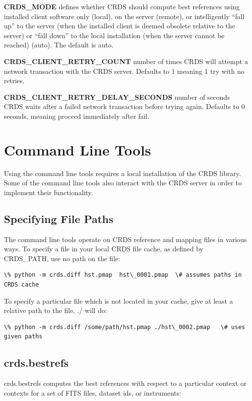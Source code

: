 \documentclass[letterpaper,10pt,english]{sphinxmanual}
\begin{document}
\textbf{CRDS\_MODE} defines whether CRDS should compute best references using
installed client software only (local),  on the server (remote),  or
intelligently ``fall up'' to the server (when the installed client is deemed
obsolete relative to the server) or ``fall down'' to the local installation
(when the server cannot be reached) (auto).   The default is auto.

\textbf{CRDS\_CLIENT\_RETRY\_COUNT} number of times CRDS will attempt a network
transaction with the CRDS server.  Defaults to 1 meaning 1 try with no retries.

\textbf{CRDS\_CLIENT\_RETRY\_DELAY\_SECONDS} number of seconds CRDS waits after a failed
network transaction before trying again.  Defaults to 0 seconds,  meaning
proceed immediately after fail.


\chapter{Command Line Tools}
\label{command_line_tools:command-line-tools}\label{command_line_tools::doc}
Using the command line tools requires a local installation of the CRDS library.
Some of the command line tools also interact with the CRDS server in order to
implement their functionality.


\section{Specifying File Paths}
\label{command_line_tools:specifying-file-paths}
The command line tools operate on CRDS reference and mapping files in various
ways.  To specify a file in your local CRDS file cache,  as defined by CRDS\_PATH,
use no path on the file:

\begin{Verbatim}[commandchars=\\\{\}]
\% python -m crds.diff hst.pmap  hst\_0001.pmap  \# assumes paths in CRDS cache
\end{Verbatim}

To specify a particular file which is not located in your cache,  give at least
a relative path to the file, ./ will do:

\begin{Verbatim}[commandchars=\\\{\}]
\% python -m crds.diff /some/path/hst.pmap ./hst\_0002.pmap   \# uses given paths
\end{Verbatim}


\section{crds.bestrefs}
\label{command_line_tools:crds-bestrefs}
crds.bestrefs computes the best references with respect to a particular context or contexts
for a set of FITS files, dataset ids,  or instruments:
\end{document}
